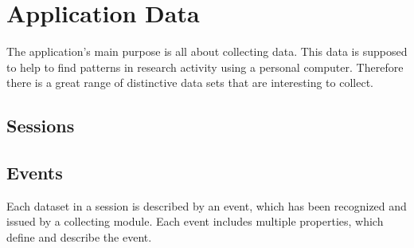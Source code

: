 \chapter{Application Data}
\label{ch:data}

\newenvironment{data}{\newcommand*\spec{\addtocounter{dataid}{10}\item[D\thedataid]}
\begin{itemize}}{\end{itemize}}

The application's main purpose is all about collecting data. This data is supposed to help to find patterns in research activity using a personal computer. Therefore there is a great range of distinctive data sets that are interesting to collect.

\section{Sessions}
\begin{data}



\end{data}

\section{Events}

Each dataset in a session is described by an event, which has been recognized and issued by a collecting module. Each event includes multiple properties, which define and describe the event.

